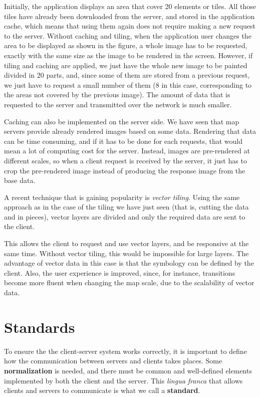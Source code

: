 Initially, the application displays an area that cover 20 elements or tiles. All those tiles have already been downloaded from the server, and stored in the application cache, which means that using them again does not require making a new request to the server. Without caching and tiling, when the application user changes the area to be displayed as shown in the figure, a whole image has to be requested, exactly with the same size as the image to be rendered in the screen. However, if tiling and caching are applied, we just have the whole new image to be painted divided in 20 parts, and, since some of them are stored from a previous request, we just have to request a small number of them (8 in this case, corresponding to the areas not covered by the previous image). The amount of data that is requested to the server and transmitted over the network is much smaller.

Caching can also be implemented on the server side. We have seen that map servers provide already rendered images based on some data. Rendering that data can be time consuming, and if it has to be done for each requests, that would mean a lot of computing cost for the server. Instead, images are pre-rendered at different scales, so when a client request is received by the server, it just has to crop the pre-rendered image instead of producing the response image from the base data.

A recent technique that is gaining popularity is \emph{vector tiling}. Using the same approach as in the case of the tiling we have just seen (that is, cutting the data and in pieces), vector layers are divided and only the required data are sent to the client.

This allows the client to request and use vector layers, and be responsive at the same time. Without vector tiling, this would be impossible for large layers. The advantage of vector data in this case is that the symbology can be defined by the client. Also, the user experience is improved, since, for instance, transitions become more fluent when changing the map scale, due to the scalability of vector data.




\section{Standards}

To ensure the the client-server system works correctly, it is important to define how the communication between servers and clients takes places. Some \textbf{normalization} is needed, and there must be common and well-defined elements implemented by both the client and the server. This \emph{lingua franca} that allows clients and servers to communicate is what we call a \textbf{standard}.

